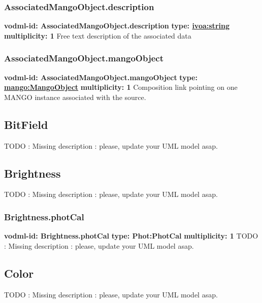     \subsubsection{AssociatedMangoObject.description}
      \textbf{vodml-id: AssociatedMangoObject.description} \newline
      \textbf{type: \hyperref[sect:ivoa]{ivoa:string}} \newline
      \textbf{multiplicity: 1} \newline
      Free text description of the associated data

    \subsubsection{AssociatedMangoObject.mangoObject}
      \textbf{vodml-id: AssociatedMangoObject.mangoObject} \newline
      \textbf{type: \hyperref[sect:MangoObject]{mango:MangoObject}} \newline
      \textbf{multiplicity: 1} \newline
      Composition link pointing on one MANGO instance associated with the source.

  \subsection{BitField}
  \label{sect:BitField}
    TODO : Missing description : please, update your UML model asap.

  \subsection{Brightness}
  \label{sect:Brightness}
    TODO : Missing description : please, update your UML model asap.

    \subsubsection{Brightness.photCal}
      \textbf{vodml-id: Brightness.photCal} \newline
      \textbf{type: Phot:PhotCal} \newline
      \textbf{multiplicity: 1} \newline
      TODO : Missing description : please, update your UML model asap.

  \subsection{Color}
  \label{sect:Color}
    TODO : Missing description : please, update your UML model asap.

